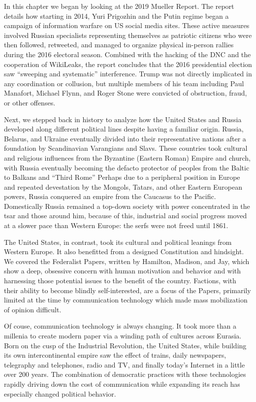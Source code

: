 \documentclass[doublespacing]{utdthesis}
\begin{document}
In this chapter we began by looking at the 2019 Mueller Report.
The report details how starting in 2014, Yuri Prigozhin and the Putin regime began a campaign of information warfare on US social media sites.
These active measures involved Russian specialists representing themselves as patriotic citizens who were then followed, retweeted, and managed to organize physical in-person rallies during the 2016 electoral season.
Combined with the hacking of the DNC and the cooperation of WikiLeaks, the report concludes that the 2016 presidential election saw ``sweeping and systematic'' interference.
Trump was not directly implicated in any coordination or collusion, but multiple members of his team including Paul Manafort, Michael Flynn, and Roger Stone were convicted of obstruction, fraud, or other offenses.

Next, we stepped back in history to analyze how the United States and Russia developed along different political lines despite having a familiar origin.
Russia, Belarus, and Ukraine eventually divided into their representative nations after a foundation by Scandinavian Varangians and Slavs.
These countries took cultural and religious influences from the Byzantine (Eastern Roman) Empire and church, with Russia eventually becoming the defacto protector of peoples from the Baltic to Balkans and ``Third Rome''
Perhaps due to a peripheral position in Europe and repeated devestation by the Mongols, Tatars, and other Eastern European powers, Russia conquered an empire from the Caucasus to the Pacific.
Domestically Russia remained a top-down society with power concentrated in the tsar and those around him, because of this, industrial and social progress moved at a slower pace than Western Europe: the serfs were not freed until 1861.

The United States, in contrast, took its cultural and political leanings from Western Europe.
It also benefitted from a designed Constitution and hindsight.
We covered the Federalist Papers, written by Hamilton, Madison, and Jay, which show a deep, obsessive concern with human motivation and behavior and with harnessing those potential issues to the benefit of the country.
Factions, with their ability to become blindly self-interested, are a focus of the Papers, primarily limited at the time by communication technology which made mass mobilization of opinion difficult.

Of couse, communication technology is always changing.
It took more than a millenia to create modern paper via a winding path of cultures across Eurasia.
Born on the cusp of the Industrial Revolution, the United States, while building its own intercontinental empire saw the effect of trains, daily newspapers, telegraphy and telephones, radio and TV, and finally today's Internet in a little over 200 years.
The combination of democratic practices with these technologies rapidly driving down the cost of communication while expanding its reach has especially changed political behavior.
\end{document}
